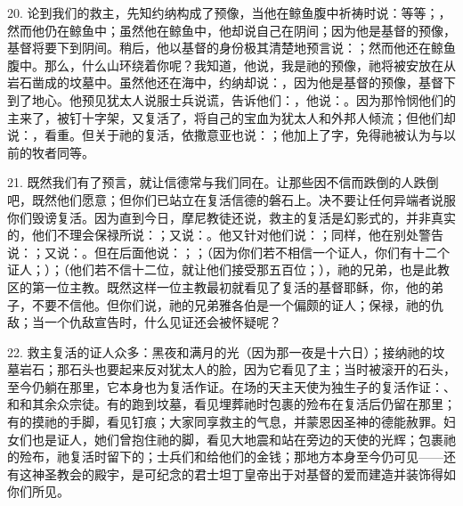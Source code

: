 20. 论到我们的救主，先知约纳构成了预像，当他在鲸鱼腹中祈祷时说：等等；，然而他仍在鲸鱼中；虽然他在鲸鱼中，他却说自己在阴间；因为他是基督的预像，基督将要下到阴间。稍后，他以基督的身份极其清楚地预言说：；然而他还在鲸鱼腹中。那么，什么山环绕着你呢？我知道，他说，我是祂的预像，祂将被安放在从岩石凿成的坟墓中。虽然他还在海中，约纳却说：，因为他是基督的预像，基督下到了地心。他预见犹太人说服士兵说谎，告诉他们：，他说：。因为那怜悯他们的主来了，被钉十字架，又复活了，将自己的宝血为犹太人和外邦人倾流；但他们却说：，看重。但关于祂的复活，依撒意亚也说：；他加上了字，免得祂被认为与以前的牧者同等。\par

21. 既然我们有了预言，就让信德常与我们同在。让那些因不信而跌倒的人跌倒吧，既然他们愿意；但你们已站立在复活信德的磐石上。决不要让任何异端者说服你们毁谤复活。因为直到今日，摩尼教徒还说，救主的复活是幻影式的，并非真实的，他们不理会保禄所说：；又说：。他又针对他们说：；同样，他在别处警告说：；又说：。但在后面他说：；；（因为你们若不相信一个证人，你们有十二个证人；）；（他们若不信十二位，就让他们接受那五百位；），祂的兄弟，也是此教区的第一位主教。既然这样一位主教最初就看见了复活的基督耶稣，你，他的弟子，不要不信他。但你们说，祂的兄弟雅各伯是一个偏颇的证人；保禄，祂的仇敌；当一个仇敌宣告时，什么见证还会被怀疑呢？\par

22. 救主复活的证人众多：黑夜和满月的光（因为那一夜是十六日）；接纳祂的坟墓岩石；那石头也要起来反对犹太人的脸，因为它看见了主；当时被滚开的石头，至今仍躺在那里，它本身也为复活作证。在场的天主天使为独生子的复活作证：、和和其余众宗徒。有的跑到坟墓，看见埋葬祂时包裹的殓布在复活后仍留在那里；有的摸祂的手脚，看见钉痕；大家同享救主的气息，并蒙恩因圣神的德能赦罪。妇女们也是证人，她们曾抱住祂的脚，看见大地震和站在旁边的天使的光辉；包裹祂的殓布，祂复活时留下的；士兵们和给他们的金钱；那地方本身至今仍可见——还有这神圣教会的殿宇，是可纪念的君士坦丁皇帝出于对基督的爱而建造并装饰得如你们所见。\par

